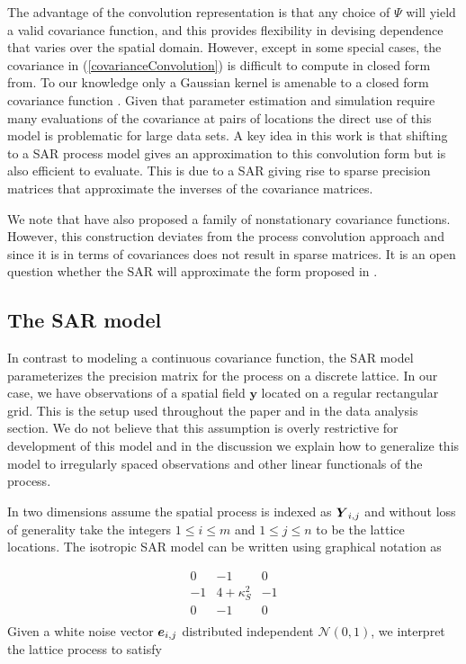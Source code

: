 \documentclass[review]{elsarticle}
\begin{document}
The advantage of the convolution representation is that any choice of $\Psi$ will yield a valid covariance function, and this provides flexibility in devising dependence that varies over the spatial domain.  However, except in some special cases, the covariance  in (\ref{covarianceConvolution}) is difficult to compute in closed form from. To our knowledge only a Gaussian kernel is amenable to a closed form covariance function \cite{higdon1999non}. Given that parameter estimation and simulation require many evaluations of the covariance at pairs of locations the direct use of this model is problematic for large data sets. A key idea in this work is that shifting to a SAR process model gives an approximation to this convolution form but is also efficient to evaluate.  
This is due to a SAR giving rise to sparse precision matrices that approximate the inverses of the covariance matrices. 

We note that \citet{paciorek2004nonstationary} have also proposed a family of nonstationary covariance functions.  However, this construction deviates from the process convolution approach and  since it is in terms of covariances does not result in sparse matrices. It is an open question whether the SAR will approximate the form proposed in \cite{paciorek2004nonstationary}. 

\subsection{The SAR model}
\label{ss:SAR}

In contrast to modeling a continuous covariance function, the SAR model parameterizes the precision matrix for the process on a discrete lattice. In our case, we have observations of a spatial field $\mathbf{y}$ located on a regular rectangular grid. This is the setup used throughout the paper and in the data analysis section. 
We do not believe that this assumption is overly restrictive for development of this model and in the discussion we explain how to generalize this model to irregularly spaced observations and other linear functionals of the process. 

In two dimensions  assume the spatial process is indexed as $\mbox{\boldmath $Y$}_{i,j}$  and without loss of generality take the integers  $1 \le i \le m$ and $1\le j \le n$  to be the lattice locations.    The 
isotropic SAR model can be written using graphical notation as 

\begin{equation}
\label{e:2}
    \begin{array}{c|c|c}
      0 & -1 & 0 \\
      \hline
      -1 & 4+ \kappa_S^2 & -1 \\
      \hline
      0 & -1 & 0 \\
    \end{array}
\end{equation} 
Given a white noise vector $\mbox{\boldmath $e$}_{i,j}$ distributed independent $\mathcal N(0, 1)$, we interpret the lattice process to satisfy 
 
\end{document}
